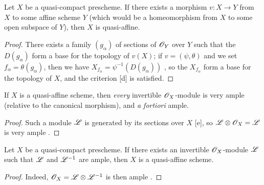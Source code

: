 \begin{cor}[5.1.3]
\label{1.5.1.3}
Let $X$ be a quasi-compact prescheme.
If there exists a morphism $v:X\to Y$ from $X$ to some affine scheme $Y$ (which would be a homeomorphism from $X$ to some open subspace of $Y$), then $X$ is quasi-affine.
\end{cor}

\begin{proof}
\label{proof-2.5.1.3}
There exists a family $(g_\alpha)$ of sections of $\mathscr{O}_Y$ over $Y$ such that the $D(g_\alpha)$ form a base for the topology of $v(X)$;
if $v=(\psi,\theta)$ and we set $f_\alpha=\theta(g_\alpha)$, then we have $X_{f_\alpha}=\psi^{-1}(D(g_\alpha))$ , so the $X_{f_\alpha}$ form a base for the topology of $X$, and the criterion [d] is satisfied.
\end{proof}

\begin{cor}[5.1.4]
\label{2.5.1.4}
If $X$ is a quasi-affine scheme, then \emph{every} invertible $\mathscr{O}_X$-module is very ample (relative to the canonical morphism), and \emph{a fortiori} ample.
\end{cor}

\begin{proof}
\label{proof-2.5.1.4}
Such a module $\mathscr{L}$ is generated by its sections over $X$ [e], so $\mathscr{L}\otimes\mathscr{O}_X=\mathscr{L}$ is very ample .
\end{proof}

\begin{cor}[5.1.5]
\label{2.5.1.5}
Let $X$ be a quasi-compact prescheme.
If there exists an invertible $\mathscr{O}_X$-module $\mathscr{L}$ such that $\mathscr{L}$ and $\mathscr{L}^{-1}$ are ample, then $X$ is a quasi-affine scheme.
\end{cor}

\begin{proof}
\label{proof-2.5.1.5}
Indeed, $\mathscr{O}_X=\mathscr{L}\otimes\mathscr{L}^{-1}$ is then ample .
\end{proof}

